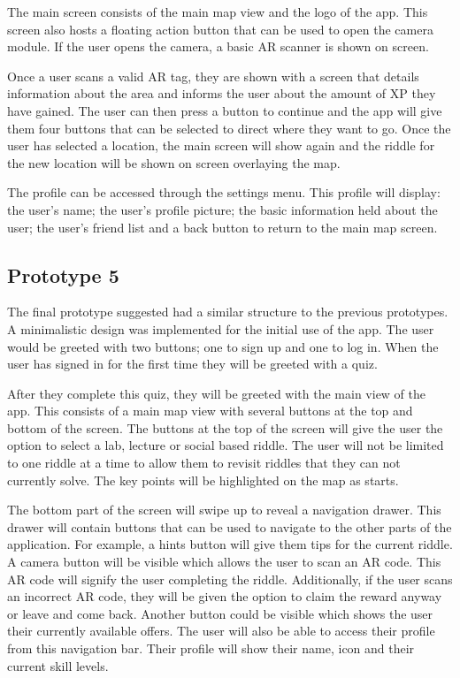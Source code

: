 \documentclass[10pt,twocolumn]{article} %
\begin{document}
The main screen consists of the main map view and the logo of the app. This screen also hosts a floating action button that can be used to open the camera module. If the user opens the camera, a basic AR scanner is shown on screen. 

Once a user scans a valid AR tag, they are shown with a screen that details information about the area and informs the user about the amount of XP they have gained. The user can then press a button to continue and the app will give them four buttons that can be selected to direct where they want to go. Once the user has selected a location, the main screen will show again and the riddle for the new location will be shown on screen overlaying the map.

The profile can be accessed through the settings menu. This profile will display: the user's name; the user's profile picture; the basic information held about the user; the user's friend list and a back button to return to the main map screen.

\subsection*{Prototype 5}

The final prototype suggested had a similar structure to the previous prototypes. A minimalistic design was implemented for the initial use of the app. The user would be greeted with two buttons; one to sign up and one to log in. When the user has signed in for the first time they will be greeted with a quiz.

After they complete this quiz, they will be greeted with the main view of the app. This consists of a main map view with several buttons at the top and bottom of the screen. The buttons at the top of the screen will give the user the option to select a lab, lecture or social based riddle. The user will not be limited to one riddle at a time to allow them to revisit riddles that they can not currently solve. The key points will be highlighted on the map as starts.

The bottom part of the screen will swipe up to reveal a navigation drawer. This drawer will contain buttons that can be used to navigate to the other parts of the application. For example, a hints button will give them tips for the current riddle. A camera button will be visible which allows the user to scan an AR code. This AR code will signify the user completing the riddle. Additionally, if the user scans an incorrect AR code, they will be given the option to claim the reward anyway or leave and come back. Another button could be visible which shows the user their currently available offers. The user will also be able to access their profile from this navigation bar. Their profile will show their name, icon and their current skill levels.
\end{document}
